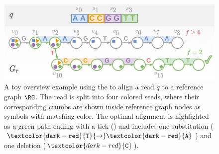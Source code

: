 \begin{figure}[t]
    \centering
	\includegraphics[width=0.6\linewidth]{figures/seed-heuristic-diagram.png}
	\caption{%
		A toy overview example using the \seedh to align a read $q$ to a
		reference graph $\RG$. The read is split into four colored seeds, where
		their corresponding crumbs are shown inside reference graph nodes as
		symbols with matching color. The optimal alignment is highlighted as a
		green path ending with a tick (\protect\greentick{}) and includes one
		substitution
		($\mathtt{\textcolor{dark-red}{T}{\rightarrow}\textcolor{dark-red}{A}}$)
		and one deletion ($\textcolor{dark-red}{\mathtt{C}}$).
	}
\label{SEEDfig:overview}
\end{figure}